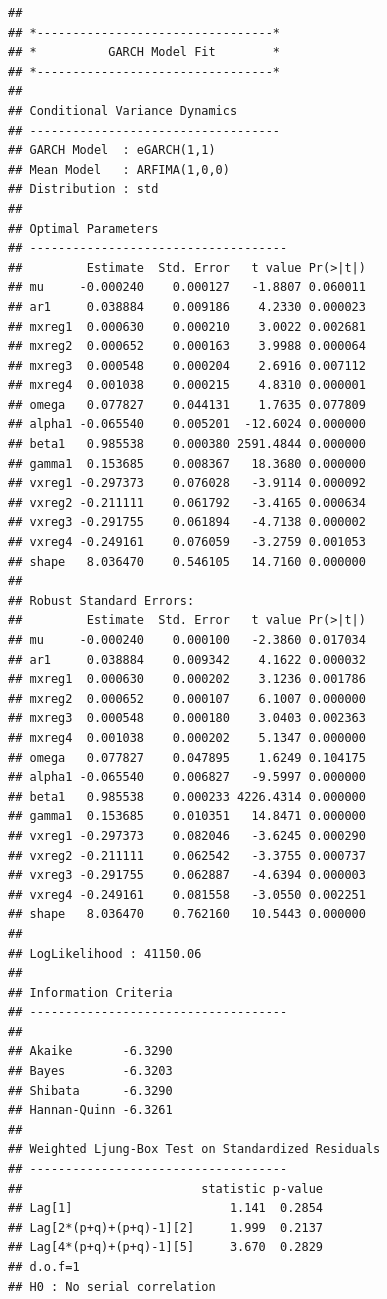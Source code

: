 \documentclass[
  11pt,
]{article}
\begin{document}
\begin{verbatim}
## 
## *---------------------------------*
## *          GARCH Model Fit        *
## *---------------------------------*
## 
## Conditional Variance Dynamics    
## -----------------------------------
## GARCH Model  : eGARCH(1,1)
## Mean Model   : ARFIMA(1,0,0)
## Distribution : std 
## 
## Optimal Parameters
## ------------------------------------
##         Estimate  Std. Error   t value Pr(>|t|)
## mu     -0.000240    0.000127   -1.8807 0.060011
## ar1     0.038884    0.009186    4.2330 0.000023
## mxreg1  0.000630    0.000210    3.0022 0.002681
## mxreg2  0.000652    0.000163    3.9988 0.000064
## mxreg3  0.000548    0.000204    2.6916 0.007112
## mxreg4  0.001038    0.000215    4.8310 0.000001
## omega   0.077827    0.044131    1.7635 0.077809
## alpha1 -0.065540    0.005201  -12.6024 0.000000
## beta1   0.985538    0.000380 2591.4844 0.000000
## gamma1  0.153685    0.008367   18.3680 0.000000
## vxreg1 -0.297373    0.076028   -3.9114 0.000092
## vxreg2 -0.211111    0.061792   -3.4165 0.000634
## vxreg3 -0.291755    0.061894   -4.7138 0.000002
## vxreg4 -0.249161    0.076059   -3.2759 0.001053
## shape   8.036470    0.546105   14.7160 0.000000
## 
## Robust Standard Errors:
##         Estimate  Std. Error   t value Pr(>|t|)
## mu     -0.000240    0.000100   -2.3860 0.017034
## ar1     0.038884    0.009342    4.1622 0.000032
## mxreg1  0.000630    0.000202    3.1236 0.001786
## mxreg2  0.000652    0.000107    6.1007 0.000000
## mxreg3  0.000548    0.000180    3.0403 0.002363
## mxreg4  0.001038    0.000202    5.1347 0.000000
## omega   0.077827    0.047895    1.6249 0.104175
## alpha1 -0.065540    0.006827   -9.5997 0.000000
## beta1   0.985538    0.000233 4226.4314 0.000000
## gamma1  0.153685    0.010351   14.8471 0.000000
## vxreg1 -0.297373    0.082046   -3.6245 0.000290
## vxreg2 -0.211111    0.062542   -3.3755 0.000737
## vxreg3 -0.291755    0.062887   -4.6394 0.000003
## vxreg4 -0.249161    0.081558   -3.0550 0.002251
## shape   8.036470    0.762160   10.5443 0.000000
## 
## LogLikelihood : 41150.06 
## 
## Information Criteria
## ------------------------------------
##                     
## Akaike       -6.3290
## Bayes        -6.3203
## Shibata      -6.3290
## Hannan-Quinn -6.3261
## 
## Weighted Ljung-Box Test on Standardized Residuals
## ------------------------------------
##                         statistic p-value
## Lag[1]                      1.141  0.2854
## Lag[2*(p+q)+(p+q)-1][2]     1.999  0.2137
## Lag[4*(p+q)+(p+q)-1][5]     3.670  0.2829
## d.o.f=1
## H0 : No serial correlation

\end{verbatim}
\end{document}
